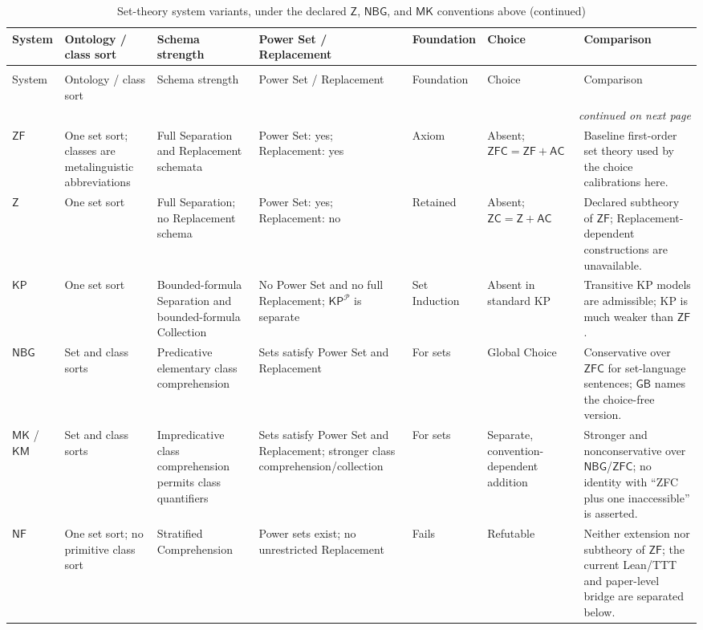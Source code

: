 \begin{landscape}
\begingroup\scriptsize
\setlength{\tabcolsep}{2.5pt}
\begin{longtable}{@{}p{.48in}p{.95in}p{1.15in}p{1.05in}p{.70in}
  p{.85in}p{1.65in}@{}}
\caption{Set-theory system variants, under the declared
  \(\mathsf Z\), \(\mathsf{NBG}\), and \(\mathsf{MK}\) conventions above.}
\label{tab:p06-set-theory-variants}\\
\toprule
System & Ontology / class sort & Schema strength & Power Set / Replacement &
Foundation & Choice & Comparison \\
\midrule
\endfirsthead
\caption[]{Set-theory system variants, under the declared
  \(\mathsf Z\), \(\mathsf{NBG}\), and \(\mathsf{MK}\) conventions above (continued)}\\
\toprule
System & Ontology / class sort & Schema strength & Power Set / Replacement &
Foundation & Choice & Comparison \\
\midrule
\endhead
\midrule\multicolumn{7}{r}{\emph{continued on next page}}\\
\endfoot
\endlastfoot
\(\mathsf{ZF}\) & One set sort; classes are metalinguistic abbreviations &
Full Separation and Replacement schemata & Power Set: yes; Replacement: yes &
Axiom & Absent; \(\mathsf{ZFC}=\mathsf{ZF}+\mathsf{AC}\) & Baseline
first-order set theory used by the choice calibrations here. \\
\(\mathsf Z\) & One set sort & Full Separation; no Replacement schema &
Power Set: yes; Replacement: no & Retained & Absent;
\(\mathsf{ZC}=\mathsf Z+\mathsf{AC}\) & Declared subtheory of \(\mathsf{ZF}\);
Replacement-dependent constructions are unavailable. \\
\(\mathsf{KP}\) & One set sort & Bounded-formula Separation and
bounded-formula Collection & No Power Set and no full Replacement;
\(\mathsf{KP}^{\mathcal P}\) is separate & Set Induction & Absent in standard
KP & Transitive KP models are admissible; KP is much weaker than
\(\mathsf{ZF}\). \\
\(\mathsf{NBG}\) & Set and class sorts & Predicative elementary class
comprehension & Sets satisfy Power Set and Replacement & For sets & Global
Choice & Conservative over \(\mathsf{ZFC}\) for set-language sentences;
\(\mathsf{GB}\) names the choice-free version. \\
\(\mathsf{MK}\) / \(\mathsf{KM}\) & Set and class sorts & Impredicative class
comprehension permits class quantifiers & Sets satisfy Power Set and
Replacement; stronger class comprehension/collection & For sets & Separate,
convention-dependent addition & Stronger and nonconservative over
\(\mathsf{NBG}\)/\(\mathsf{ZFC}\); no identity with ``ZFC plus one
inaccessible'' is asserted. \\
\(\mathsf{NF}\) & One set sort; no primitive class sort & Stratified
Comprehension & Power sets exist; no unrestricted Replacement & Fails &
Refutable & Neither extension nor subtheory of \(\mathsf{ZF}\); the current
Lean/TTT and paper-level bridge are separated below. \\
\bottomrule
\end{longtable}
\endgroup
\end{landscape}

